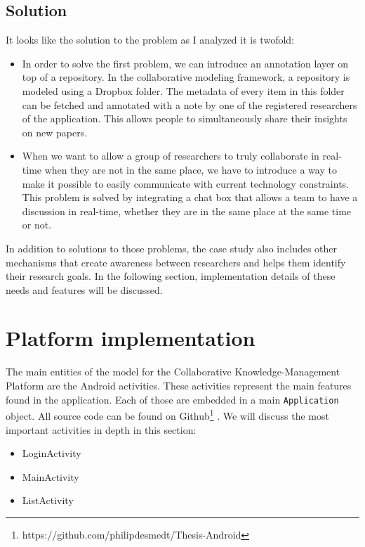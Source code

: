 \subsection{Solution}

It looks like the solution to the problem as I analyzed it is twofold:
\begin{itemize}
\item{In order to solve the first problem, we can introduce an annotation layer on top of a repository. In the collaborative modeling framework, a repository is modeled using a Dropbox folder. The metadata of every item in this folder can be fetched and annotated with a note by one of the registered researchers of the application. This allows people to simultaneously share their insights on new papers.} 
\item{When we want to allow a group of researchers to truly collaborate in real-time when they are not in the same place, we have to introduce a way to make it possible to easily communicate with current technology constraints. This problem is solved by integrating a chat box that allows a team to have a discussion in real-time, whether they are in the same place at the same time or not.}
\end{itemize}
In addition to solutions to those problems, the case study also includes other mechanisms that create awareness between researchers and helps them identify their research goals. In the following section, implementation details of these needs and features will be discussed.

\section{Platform implementation}

The main entities of the model for the Collaborative Knowledge-Management Platform are the Android activities. These activities represent the main features found in the application. Each of those are embedded in a main \texttt{Application} object. All source code can be found on Github\footnote{https://github.com/philipdesmedt/Thesis-Android} \cite{Github}. We will discuss the most important activities in depth in this section:

\begin{itemize}
\item{LoginActivity}
\item{MainActivity}
\item{ListActivity}
\end{itemize} 


